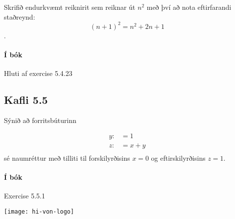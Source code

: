 \documentclass{exam}
\begin{document}
\begin{questions}
\question Skrifið endurkvæmt reiknirit sem reiknar út $n^2$ með því að nota eftirfarandi staðreynd: \[(n + 1)^2 = n^2 + 2n + 1\].

\paragraph{Í bók} Hluti af exercise 5.4.23

\subsection{Kafli 5.5}

Sýnið að forritsbúturinn 

\begin{align*}
y: &= 1\\
z: &= x + y\\
\end{align*}
sé naumréttur með tilliti til forskilyrðisins $x = 0$ og eftirskilyrðisins $z = 1$.

\paragraph{Í bók} Exercise 5.5.1

\end{questions}

\vfill
\texttt{[image: hi-von-logo]}
\end{document}
